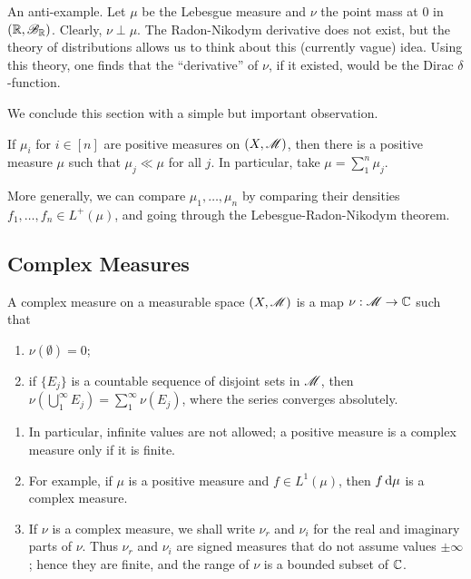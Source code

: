 \documentclass[12pt]{article} %
\begin{document}
\begin{example}
    An anti-example. Let $\mu$ be the Lebesgue measure and $\nu$ the point mass at 0 in $(\mathbb{R}, \mathscr{B}_{\mathbb{R}})$. Clearly, $\nu \perp \mu$. The Radon-Nikodym derivative does not exist, but the theory of distributions allows us to think about this (currently vague) idea. Using this theory, one finds that the ``derivative'' of $\nu$, if it existed, would be the Dirac $\delta$-function.
\end{example}

We conclude this section with a simple but important observation.

\begin{proposition}\label{prop:3.11}
    If $\mu_i$ for $i \in [n]$ are positive measures on $(X, \mathscr{M})$, then there is a positive measure $\mu$ such that $\mu_j \ll \mu$ for all $j$. In particular, take $\mu = \sum_1^n \mu_j$.
\end{proposition}

\begin{remark}
    More generally, we can compare $\mu_1, \ldots, \mu_n$ by comparing their densities $f_1, \ldots, f_n \in L^+(\mu)$, and going through the Lebesgue-Radon-Nikodym theorem.
\end{remark}

\subsection{Complex Measures}

\begin{definition}
    A complex measure on a measurable space $(X, \mathscr{M})$ is a map $\nu : \mathscr{M} \to \mathbb{C}$ such that \begin{enumerate}
        \item $\nu(\emptyset) = 0$;
        \item if $\{E_j\}$ is a countable sequence of disjoint sets in $\mathscr{M}$, then $\nu(\bigcup_1^\infty E_j) = \sum_1^\infty \nu(E_j)$, where the series converges absolutely.
    \end{enumerate}
\end{definition}

\begin{remark}
    \begin{enumerate}
        \item In particular, infinite values are not allowed; a positive measure is a complex measure only if it is finite.
        \item For example, if $\mu$ is a positive measure and $f \in L^1(\mu)$, then $f \, \mathrm{d} \mu$ is a complex measure.
        \item If $\nu$ is a complex measure, we shall write $\nu_r$ and $\nu_i$ for the real and imaginary parts of $\nu$. Thus $\nu_r$ and $\nu_i$ are signed measures that do not assume values $\pm \infty$; hence they are finite, and the range of $\nu$ is a bounded subset of $\mathbb{C}$.
    \end{enumerate}
\end{remark}
\end{document}
